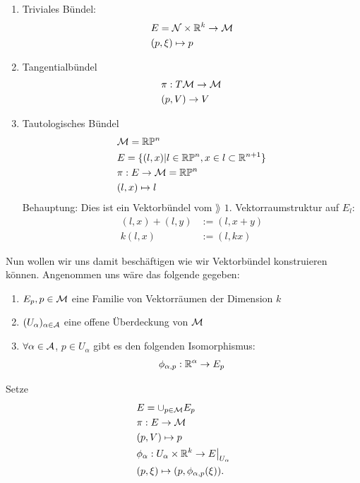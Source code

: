 \begin{bsp} \leavevmode
\begin{enumerate}
\item Triviales Bündel:
\begin{align}
&E = \mathcal{N} \times \mathbb{R}^k \to \mathcal{M}\\
&(p, \xi) \mapsto p
\end{align}
\item Tangentialbündel 
\begin{align}
&\pi: T\mathcal{M} \to \mathcal{M}\\
&(p, V) \to V
\end{align}
\item Tautologisches Bündel
\begin{align}
&\mathcal{M} = \mathbb{R} \mathbb{P}^n\\
&E = \{ (l, x) \vert l \in \mathbb{R} \mathbb{P}^n, x\in l \subset \mathbb{R}^{n+1} \}\\
&\pi: E \to \mathcal{M} = \mathbb{R} \mathbb{P}^n\\
&(l, x) \mapsto l
\end{align}
Behauptung: Dies ist ein Vektorbündel vom $\rang$ $1$.
Vektorraumstruktur auf $E_l$:
\begin{align}
(l, x) + (l, y) &:= (l, x + y)\\
k (l, x) &:= (l, k x)
\end{align}
\end{enumerate}
\end{bsp}
Nun wollen wir uns damit beschäftigen wie wir Vektorbündel konstruieren können.
Angenommen uns wäre das folgende gegeben:
\begin{enumerate}
\item $E_p, p\in \mathcal{M}$ eine Familie von Vektorräumen der Dimension $k$
\item $(U_\alpha)_{\alpha \in \mathcal{A}}$ eine offene Überdeckung von $\mathcal{M}$
\item $\forall \alpha \in \mathcal{A}$, $p\in U_\alpha$ gibt es den folgenden Isomorphismus:
\begin{align}
\phi_{\alpha, p}: \mathbb{R}^\alpha \to E_p
\end{align}
\end{enumerate}
Setze 
\begin{align}
&E = \cup_{p \in \mathcal{M}} E_p\\
&\pi : E \to \mathcal{M}\\
&(p, V) \mapsto p\\
&\phi_\alpha: U_\alpha \times \mathbb{R}^k \to E \big\vert_{U_\alpha}\\
&(p, \xi) \mapsto (p, \phi_{\alpha, p}(\xi)).
\end{align}
